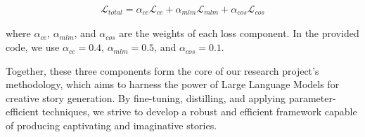 \documentclass{article} %
\begin{document}
\begin{align}
\mathcal{L}_{total} = \alpha_{ce} \mathcal{L}_{ce} + \alpha_{mlm} \mathcal{L}_{mlm} + \alpha_{cos} \mathcal{L}_{cos}
\end{align}

where $\alpha_{ce}$, $\alpha_{mlm}$, and $\alpha_{cos}$ are the weights of each loss component. In the provided code, we use $\alpha_{ce} = 0.4$, $\alpha_{mlm} = 0.5$, and $\alpha_{cos} = 0.1$.


Together, these three components form the core of our research project's methodology, which aims to harness the power of Large Language Models for creative story generation. By fine-tuning, distilling, and applying parameter-efficient techniques, we strive to develop a robust and efficient framework capable of producing captivating and imaginative stories.

\end{document}
